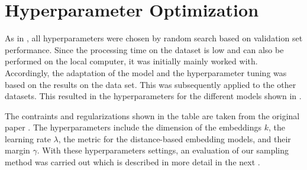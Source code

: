 \section{Hyperparameter Optimization}
\label{sec:hyperparameter_optimization}
%
As in \cite{TuckER}, all hyperparameters were chosen by random search based on validation set performance.
Since the processing time on the \umls dataset is low and can also be performed on the local computer, it was initially mainly worked with.
Accordingly, the adaptation of the model and the hyperparameter tuning was based on the results on the \umls data set.
This was subsequently applied to the other datasets.
This resulted in the hyperparameters for the different models shown in .


The contraints and regularizations shown in the table are taken from the original paper \cite{cai2017kbgan}.
The hyperparameters include the dimension of the embeddings $k$, the learning rate $\lambda$, the metric for the distance-based embedding models, and their margin $\gamma$.
With these hyperparameters settings, an evaluation of our sampling method \usgan was carried out which is described in more detail in the next .